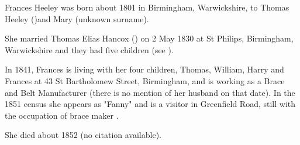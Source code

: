 
Frances Heeley was born about 1801 in Birmingham, Warwickshire, to Thomas Heeley ()and Mary (unknown surname).  

She married Thomas Elias Hancox () on 2 May 1830 at St Philips, Birmingham, Warwickshire and they had five children (see ).	

In 1841, Frances is living with her four children, Thomas, William, Harry and Frances at 43 St Bartholomew Street, Birmingham,   and is working as a Brace and Belt Manufacturer  \cite{FrancesHeeleyWork} (there is no mention of her husband on that date).  In the 1851 census she appears as "Fanny" and is a visitor in Greenfield Road, still with the occupation of brace maker .

She died about 1852 (no citation available).

